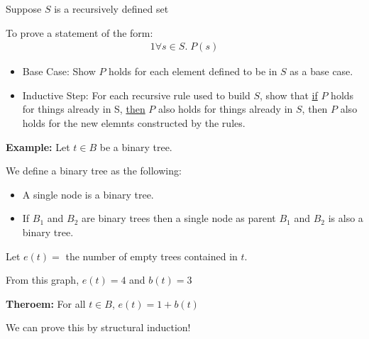 \documentclass{article}
\begin{document}
Suppose $ S $ is a recursively defined set

To prove a statement of the form:
\begin{alignat*}{1}
\forall s \in S. \; P(s)
\end{alignat*}

\begin{itemize}
  \item Base Case: Show $ P $ holds for each element defined to be in $ S $ as a base case.
  \item Inductive Step: For each recursive rule used to build $ S $, show that \underline{if} $ P $ holds for 
  things already in S, \underline{then} $ P $ also holds for things already in $ S $, then $ P $ also holds for 
  the new elemnts constructed by the rules.
\end{itemize}

\textbf{Example:}
Let $ t \in B $ be a binary tree.

We define a binary tree as the following:
\begin{itemize}
  \item A single node is a binary tree.
  \item If $B_1$ and $B_2$ are binary trees then a single node as parent $B_1$ and $B_2$ is also a binary tree.
\end{itemize}
Let $ e(t) = $ the number of empty trees
contained in $ t $.
\begin{center}
\end{center}

From this graph, $ e(t) = 4 $ and $ b(t) = 3 $

\textbf{Theroem:} For all $ t \in B $, $ e(t) = 1 + b(t) $

We can prove this by structural induction!
\end{document}
